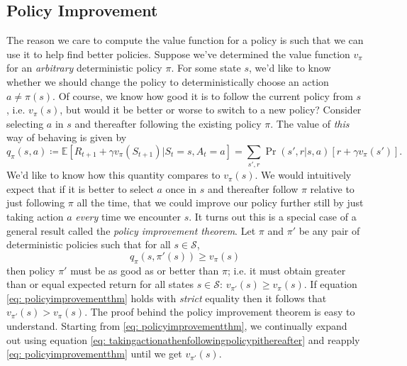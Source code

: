 \documentclass[12pt]{article}
\begin{document}
\subsection{Policy Improvement}
The reason we care to compute the value function for a policy is such that we can use it to help find better policies. Suppose we've determined the value function $v_\pi$ for an \emph{arbitrary} deterministic policy $\pi$. For some state $s$, we'd like to know whether we should change the policy to deterministically choose an action $a \neq \pi(s)$. Of course, we know how good it is to follow the current policy from $s$, i.e. $v_\pi(s)$, but would it be better or worse to switch to a new policy? Consider selecting $a$ in $s$ and thereafter following the existing policy $\pi$. The value of \emph{this} way of behaving is given by
\begin{equation}
  \label{eq: takingactionathenfollowingpolicypithereafter}
  q_\pi(s,a) \coloneqq \mathbb E \left[ R_{t+1} + \gamma v_\pi(S_{t+1}) | S_t =     s, A_t = a \right] = \sum_{s',r} \Pr(s',r | s,a) \left[ r + \gamma v_\pi(s')\right].
\end{equation}
We'd like to know how this quantity compares to $v_\pi(s)$. We would intuitively expect that if it is better to select $a$ once in $s$ and thereafter follow $\pi$ relative to just following $\pi$ all the time, that we could improve our policy further still by just taking action $a$ \emph{every} time we encounter $s$. It turns out this is a special case of a general result called the \emph{policy improvement theorem}. Let $\pi$ and $\pi'$ be any pair of deterministic policies such that for all $s \in \mathcal S$,
\begin{equation}
  \label{eq: policyimprovementthm}
  q_\pi(s, \pi'(s)) \geq v_\pi(s)
\end{equation}
then policy $\pi'$ must be as good as or better than $\pi$; i.e. it must obtain greater than or equal expected return for all states $s \in \mathcal S$: $v_{\pi'}(s) \geq v_\pi(s)$. If equation \ref{eq: policyimprovementthm} holds with \emph{strict} equality then it follows that $v_{\pi'}(s) > v_\pi(s)$. The proof behind the policy improvement theorem is easy to understand. Starting from \ref{eq: policyimprovementthm}, we continually expand out using equation \ref{eq: takingactionathenfollowingpolicypithereafter} and reapply \ref{eq:   policyimprovementthm} until we get $v_{\pi'}(s)$.
\end{document}
